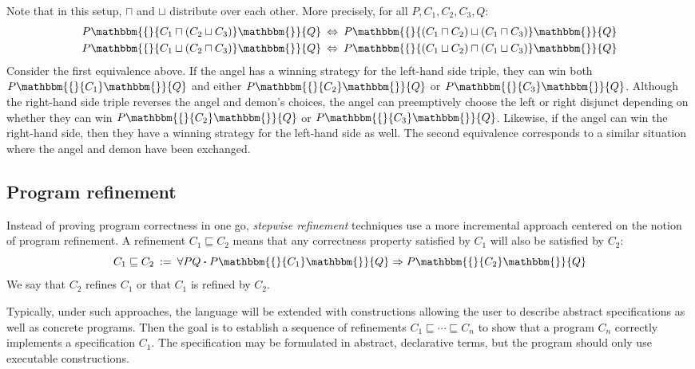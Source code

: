 \documentclass[11pt,oneside,draft]{book}
\theoremstyle{definition}
\newcommand{\bdot}{\boldsymbol{\cdot}}
\newcommand{\htr}[3]{{ {#1} \mathbbm{\{} {#2} \mathbbm{\}} {#3} }}
\begin{document}
Note that in this setup,
$\sqcap$ and $\sqcup$ distribute over each other.
More precisely, for all $P, C_1, C_2, C_3, Q$:
\begin{align*}
  \htr{P}{C_1 \sqcap (C_2 \sqcup C_3)}{Q} \: &\Leftrightarrow \:
    \htr{P}{(C_1 \sqcap C_2) \sqcup (C_1 \sqcap C_3)}{Q} \\
  \htr{P}{C_1 \sqcup (C_2 \sqcap C_3)}{Q} \: &\Leftrightarrow \:
    \htr{P}{(C_1 \sqcup C_2) \sqcap (C_1 \sqcup C_3)}{Q}
\end{align*}
Consider the first equivalence above.
If the angel has a winning strategy for
the left-hand side triple,
they can win both $\htr{P}{C_1}{Q}$
and either $\htr{P}{C_2}{Q}$ or $\htr{P}{C_3}{Q}$.
Although the right-hand side triple
reverses the angel and demon's choices,
the angel can preemptively choose the left or right
disjunct depending on whether they can win
$\htr{P}{C_2}{Q}$ or $\htr{P}{C_3}{Q}$.
Likewise, if the angel can win the right-hand side,
then they have a winning strategy for the left-hand side as well.
The second equivalence corresponds to a similar situation
where the angel and demon have been exchanged.


\subsection{Program refinement} %

Instead of proving program correctness in one go,
\emph{stepwise refinement} techniques use a more incremental approach
centered on the notion of program refinement.
A refinement $C_1 \sqsubseteq C_2$
means that any correctness property satisfied by $C_1$
will also be satisfied by $C_2$:
\[
    C_1 \sqsubseteq C_2 \: := \:
    \forall P Q \bdot
      \htr{P}{C_1}{Q} \Rightarrow
      \htr{P}{C_2}{Q}
\]
We say that $C_2$ refines $C_1$
or that $C_1$ is refined by $C_2$.

Typically,
under such approaches,
the language will be extended with constructions
allowing the user to describe
abstract specifications as well as
concrete programs.
Then the goal is to establish
a sequence of refinements
$C_1 \sqsubseteq \cdots \sqsubseteq C_n$
to show that a program $C_n$
correctly implements a specification $C_1$.
The specification may be formulated in
abstract, declarative terms,
but the program should only use executable constructions.
\end{document}
